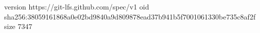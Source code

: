 version https://git-lfs.github.com/spec/v1
oid sha256:38059161868a0e02bd9840a9d809878ead37b941b5f7001061330be735c8af2f
size 7347
